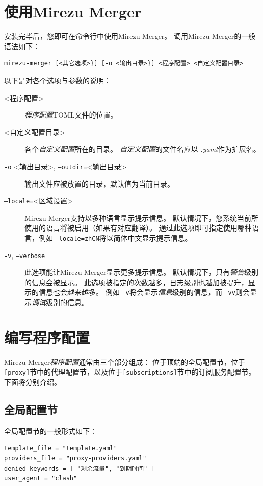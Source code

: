 \documentclass[a4paper,fontset=founder,punct=kaiming]{ctexart}
\renewcommand\_{\textunderscore\linebreak[1]}
\newcommand{\productname}{Mirezu Merger}
\begin{document}
\section{使用\productname}
\label{sec:usage}

安装完毕后，您即可在命令行中使用\productname 。
调用\productname 的一般语法如下：
\begin{verbatim}
mirezu-merger [<其它选项>}] [-o <输出目录>}] <程序配置> <自定义配置目录>
\end{verbatim}

以下是对各个选项与参数的说明：
\begin{description}
\item[\textless 程序配置\textgreater]
  \emph{程序配置}TOML文件的位置。
\item[\textless 自定义配置目录\textgreater]
  各个\emph{自定义配置}所在的目录。
  \emph{自定义配置}的文件名应以 \emph{.yaml}作为扩展名。
\item[\texttt{-o} \textless 输出目录\textgreater , \texttt{--outdir=}\textless 输出目录\textgreater]
  输出文件应被放置的目录，默认值为当前目录。
\item[\texttt{--locale=}\textless 区域设置\textgreater]
  \productname 支持以多种语言显示提示信息。
  默认情况下，您系统当前所使用的语言将被启用（如果有对应翻译）。
  通过此选项即可指定使用哪种语言，例如 \texttt{--locale=zh\_CN}将以简体中文显示提示信息。
\item[\texttt{-v}, \texttt{--verbose}]
  此选项能让\productname 显示更多提示信息。
  默认情况下，只有\emph{警告}级别的信息会被显示。
  此选项被指定的次数越多，日志级别也越加被提升，显示的信息也会越来越多。
  例如 \texttt{-v}将会显示\emph{信息}级别的信息，而 \texttt{-vv}则会显示\emph{调试}级别的信息。
\end{description}

\section{编写程序配置}
\label{sec:progconf}

\productname\emph{程序配置}通常由三个部分组成：
位于顶端的全局配置节，位于\texttt{[proxy]}节中的代理配置节，以及位于\texttt{[subscriptions]}节中的订阅服务配置节。
下面将分别介绍。

\subsection{全局配置节}
\label{sec:globalconf}

全局配置节的一般形式如下：
\begin{verbatim}
template_file = "template.yaml"
providers_file = "proxy-providers.yaml"
denied_keywords = [ "剩余流量", "到期时间" ]
user_agent = "clash"
\end{verbatim}
\end{document}
